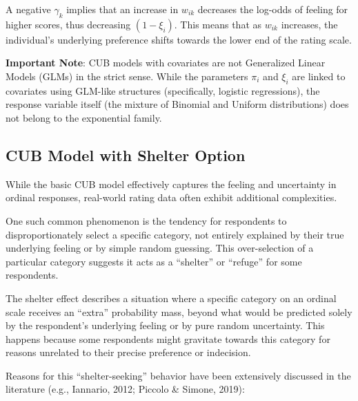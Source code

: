 \documentclass[
  letterpaper,
  DIV=11,
  numbers=noendperiod]{scrartcl}
\begin{document}
A negative \(\gamma_k\) implies that an increase in \(w_{ik}\) decreases
the log-odds of feeling for higher scores, thus decreasing
\((1-\xi_i)\). This means that as \(w_{ik}\) increases, the individual's
underlying preference shifts towards the lower end of the rating scale.

\textbf{Important Note}: CUB models with covariates are not Generalized
Linear Models (GLMs) in the strict sense. While the parameters \(\pi_i\)
and \(\xi_i\) are linked to covariates using GLM-like structures
(specifically, logistic regressions), the response variable itself (the
mixture of Binomial and Uniform distributions) does not belong to the
exponential family.

\hypertarget{cub-model-with-shelter-option}{%
\subsection{CUB Model with Shelter
Option}\label{cub-model-with-shelter-option}}

While the basic CUB model effectively captures the feeling and
uncertainty in ordinal responses, real-world rating data often exhibit
additional complexities.

One such common phenomenon is the tendency for respondents to
disproportionately select a specific category, not entirely explained by
their true underlying feeling or by simple random guessing. This
over-selection of a particular category suggests it acts as a
``shelter'' or ``refuge'' for some respondents.

The shelter effect describes a situation where a specific category on an
ordinal scale receives an ``extra'' probability mass, beyond what would
be predicted solely by the respondent's underlying feeling or by pure
random uncertainty. This happens because some respondents might
gravitate towards this category for reasons unrelated to their precise
preference or indecision.

Reasons for this ``shelter-seeking'' behavior have been extensively
discussed in the literature (e.g., Iannario, 2012; Piccolo \& Simone,
2019):
\end{document}

